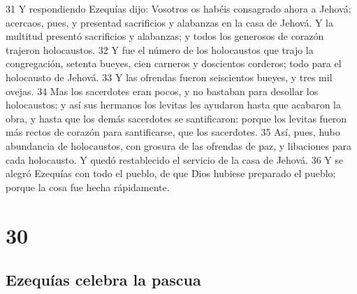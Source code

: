 31 Y respondiendo Ezequías dijo: Vosotros os habéis consagrado ahora a Jehová; acercaos, pues, y presentad sacrificios y alabanzas en la casa de Jehová. Y la multitud presentó sacrificios y alabanzas; y todos los generosos de corazón trajeron holocaustos.
32 Y fue el número de los holocaustos que trajo la congregación, setenta bueyes, cien carneros y doscientos corderos; todo para el holocausto de Jehová.
33 Y las ofrendas fueron seiscientos bueyes, y tres mil ovejas.
34 Mas los sacerdotes eran pocos, y no bastaban para desollar los holocaustos; y así sus hermanos los levitas les ayudaron hasta que acabaron la obra, y hasta que los demás sacerdotes se santificaron: porque los levitas fueron más rectos de corazón para santificarse, que los sacerdotes.
35 Así, pues, hubo abundancia de holocaustos, con grosura de las ofrendas de paz, y libaciones para cada holocausto. Y quedó restablecido el servicio de la casa de Jehová.
36 Y se alegró Ezequías con todo el pueblo, de que Dios hubiese preparado el pueblo; porque la cosa fue hecha rápidamente.

\chapter{30}

\section*{Ezequías celebra la pascua}


